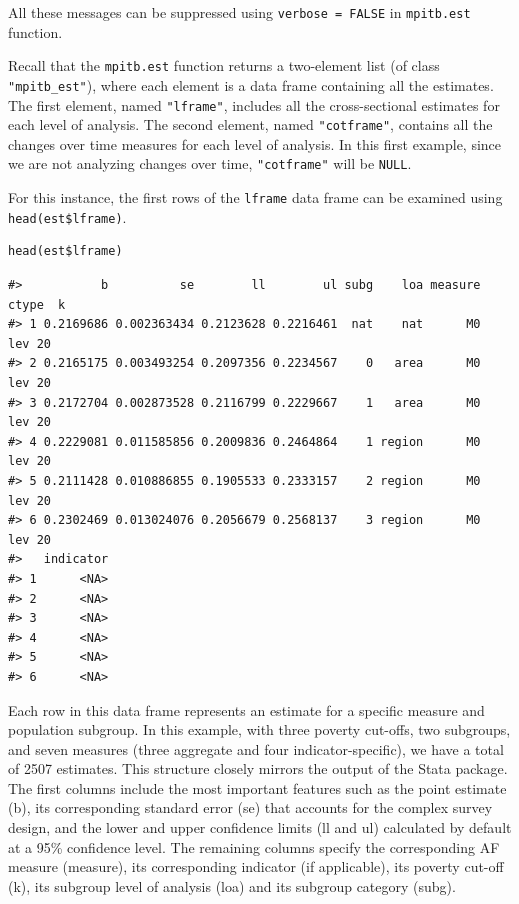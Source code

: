 All these messages can be suppressed using \texttt{verbose\ =\ FALSE} in \texttt{mpitb.est} function.

Recall that the \texttt{mpitb.est} function returns a two-element list (of class \texttt{"mpitb\_est"}), where each element is a data frame containing all the estimates. The first element, named \texttt{"lframe"}, includes all the cross-sectional estimates for each level of analysis. The second element, named \texttt{"cotframe"}, contains all the changes over time measures for each level of analysis. In this first example, since we are not analyzing changes over time, \texttt{"cotframe"} will be \texttt{NULL}.

For this instance, the first rows of the \texttt{lframe} data frame can be examined using \texttt{head(est\$lframe)}.

\begin{verbatim}
head(est$lframe)
\end{verbatim}

\begin{verbatim}
#>           b          se        ll        ul subg    loa measure ctype  k
#> 1 0.2169686 0.002363434 0.2123628 0.2216461  nat    nat      M0   lev 20
#> 2 0.2165175 0.003493254 0.2097356 0.2234567    0   area      M0   lev 20
#> 3 0.2172704 0.002873528 0.2116799 0.2229667    1   area      M0   lev 20
#> 4 0.2229081 0.011585856 0.2009836 0.2464864    1 region      M0   lev 20
#> 5 0.2111428 0.010886855 0.1905533 0.2333157    2 region      M0   lev 20
#> 6 0.2302469 0.013024076 0.2056679 0.2568137    3 region      M0   lev 20
#>   indicator
#> 1      <NA>
#> 2      <NA>
#> 3      <NA>
#> 4      <NA>
#> 5      <NA>
#> 6      <NA>
\end{verbatim}

Each row in this data frame represents an estimate for a specific measure and population subgroup. In this example, with three poverty cut-offs, two subgroups, and seven measures (three aggregate and four indicator-specific), we have a total of 2507 estimates. This structure closely mirrors the output of the Stata package. The first columns include the most important features such as the point estimate (b), its corresponding standard error (se) that accounts for the complex survey design, and the lower and upper confidence limits (ll and ul) calculated by default at a 95\% confidence level. The remaining columns specify the corresponding AF measure (measure), its corresponding indicator (if applicable), its poverty cut-off (k), its subgroup level of analysis (loa) and its subgroup category (subg).

